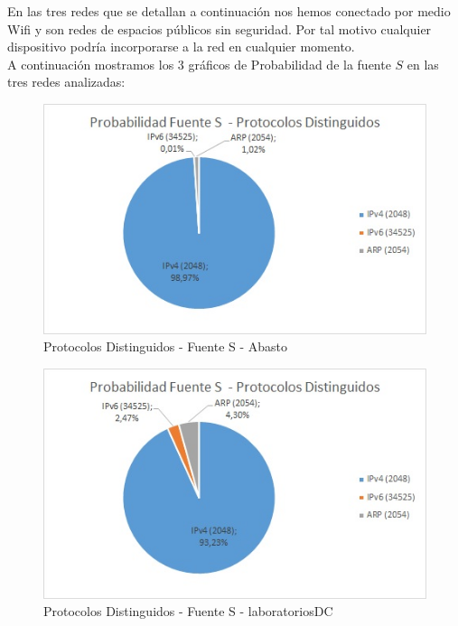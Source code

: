 En las tres redes que se detallan a continuación nos hemos conectado por medio Wifi y son redes de espacios públicos sin seguridad. 
Por tal motivo cualquier dispositivo podría incorporarse a la red en cualquier momento.\\

A continuación mostramos los 3 gráficos de Probabilidad de la fuente $S$ en las tres redes analizadas:
\begin{figure}[h!]
\centering
\includegraphics[scale=0.7]{./img/probaS_abasto.jpg}
\caption{Protocolos Distinguidos - Fuente S - Abasto}
\end{figure}

\begin{figure}[h!]
\centering
\includegraphics[scale=0.7]{./img/probaS_laboDC.jpg}
\caption{Protocolos Distinguidos - Fuente S - laboratoriosDC}
\end{figure}
\newpage


